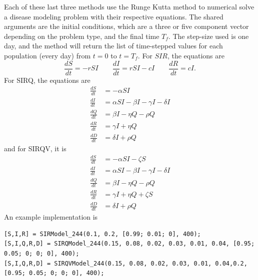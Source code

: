 \documentclass{ximera}
\begin{document}
Each of these last three methods use the Runge Kutta method to numerical solve a disease modeling problem with their respective equations. The shared arguments are the initial conditions, which are a three or five component vector depending on the problem type, and the final time $T_f$. The step-size used is one day, and the method will return the list of time-stepped values for each population (every day) from $t=0$ to $t=T_f$. For $SIR$, the equations are
\[ 
    \frac{dS}{dt} = - rSI \qquad \frac{dI}{dt} = rSI - cI \qquad \frac{dR}{dt} = cI.  
\] 
For SIRQ, the equations are
\[
    \begin{split}
        \frac{dS}{dt} &= -\alpha SI \\
        \frac{dI}{dt} &= \alpha SI - \beta I - \gamma I - \delta I \\
        \frac{dQ}{dt} &= \beta I - \eta Q - \rho Q \\
        \frac{dR}{dt} &= \gamma I + \eta Q \\
        \frac{dD}{dt} &= \delta I + \rho Q
    \end{split}
\] 
and for SIRQV, it is
\[
    \begin{split}
        \frac{dS}{dt} &= -\alpha SI- \zeta S \\
        \frac{dI}{dt} &= \alpha SI - \beta I - \gamma I - \delta I \\
        \frac{dQ}{dt} &= \beta I - \eta Q - \rho Q \\
        \frac{dR}{dt} &= \gamma I + \eta Q  + \zeta S\\
        \frac{dD}{dt} &= \delta I + \rho Q
    \end{split}
\] 
An example implementation is

\begin{verbatim}
[S,I,R] = SIRModel_244(0.1, 0.2, [0.99; 0.01; 0], 400);
[S,I,Q,R,D] = SIRQModel_244(0.15, 0.08, 0.02, 0.03, 0.01, 0.04, [0.95; 0.05; 0; 0; 0], 400);
[S,I,Q,R,D] = SIRQVModel_244(0.15, 0.08, 0.02, 0.03, 0.01, 0.04,0.2, [0.95; 0.05; 0; 0; 0], 400);
\end{verbatim}
\end{document}
